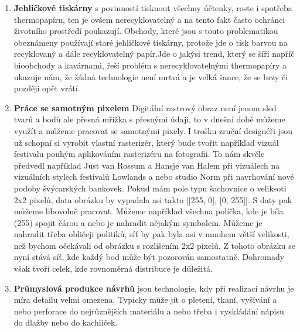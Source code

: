 \documentclass[a4paper]{article}
\begin{document}
\begin{enumerate}
\item \textbf{Jehličkové tiskárny} s povinností tisknout všechny účtenky, roste i spotřeba thermopapíru, ten je ovšem nerecyklovatelný a na tento fakt často ochránci životního prostředí poukazují. Obchody, které jsou s touto problematikou obeznámeny používají staré jehličkové tiskárny, protože jde o tisk barvou na recyklovaný a dále recyklovatelný papír.Jde o jakýsi trend, který se šíří napříč bioobchody a kavárnami, řeší problém s nerecyklovatelnými thermopapíry a ukazuje nám, že žádná technologie není mrtvá a je velká šance, že se brzy či později opět vrátí. 

\item \textbf{Práce se samotným pixelem}
Digitální rastrový obraz není jenom sled tvarů a bodů ale přesná mřížka s přesnými údaji, to v dnešní době můžeme využít a můžeme pracovat se samotnými pixely. I trošku zruční designéři jsou už schopní si vyrobit vlastní rasterizér, který bude tvořit například vizuál festivalu pouhým aplikováním rasterizéru na fotografii. To nám skvěle předvedl například Just van Rossum a Hansje van Halem při vizuálech na vizuálních stylech festivalů Lowlands a nebo studio Norm při navrhování nové podoby švýcarských bankovek. Pokud mám pole typu šachovnice o veliksoti 2x2 pixelů, data obrázku by vypadala asi takto [[255, 0], [0, 255]]. S daty pak můžeme libovolně pracovat. Můžeme například všechna políčka, kde je bíla (255) spojit čárou a nebo je nahradit nějakým symbolem. Můžeme je nahradit třeba obličeji politiků, síť by pak byla asi v mnohem větší velikosti, než bychom očekávali od obrázku s rozlišením 2x2 pixelů. Z tohoto obrázku se nyní stává síť, kde každý bod může být pozorován samostatně. Dohromady však tvoří celek, kde rovnoměrná distribuce je důležitá.

\item \textbf{Průmyslová produkce návrhů}
jsou technologie, kdy při realizaci návrhu je míra detailu velmi omezena. Typicky může jít o pletení, tkaní, vyšívání a nebo perforace do nejrůznějších materiálu a nebo třeba i vyskládání nápisu do dlažby nebo do kachliček.
\end{enumerate}
\end{document}
